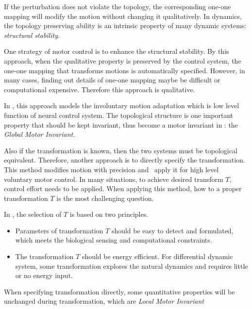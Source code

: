 If the perturbation does not violate the topology, the corresponding one-one mapping will modify the motion without changing it qualitatively.
In dynamics, the topology preserving ability is an intrinsic property of many dynamic systems:
\emph{structural stability}.

One strategy of motor control is to enhance the structural stability. 
By this approach, when the qualitative property is preserved by the control system, the one-one mapping that transforms motions is automatically specified. 
However, in many cases, finding out details of one-one mapping maybe be difficult or computational expensive.
Therefore this approach is qualitative.

In {\moit}, this approach models the involuntary motion adaptation which is low level function of neural control system.
The topological structure is one important property that should be kept invariant, thus become a motor invariant in {\moit}: the \emph{Global Motor Invariant}.






Also if the transformation is known, then the two systems must be topological equivalent.
Therefore, another approach is to directly specify the transformation.
This method  modifies motion with precision and {\moit}\ apply it for high level voluntary motor control.
In many situations, to achieve desired transform $T$, control effort needs to be applied.
When applying this method, how to a proper transformation $T$ is the most challenging  question.

In {\moit}, the selection of $T$ is based on two principles.
\begin{itemize}
\item
Parameters of transformation $T$ should be easy to detect and formulated, which meets the biological sensing and computational constraints. 

\item 
The transformation $T$ should be energy efficient.
For differential dynamic system, some transformation explores the natural dynamics and requires little or no energy input.
\end{itemize}

When specifying transformation directly, some quantitative properties will be unchanged during transformation, which are \emph{Local Motor Invariant}






%
%
%
%
%




